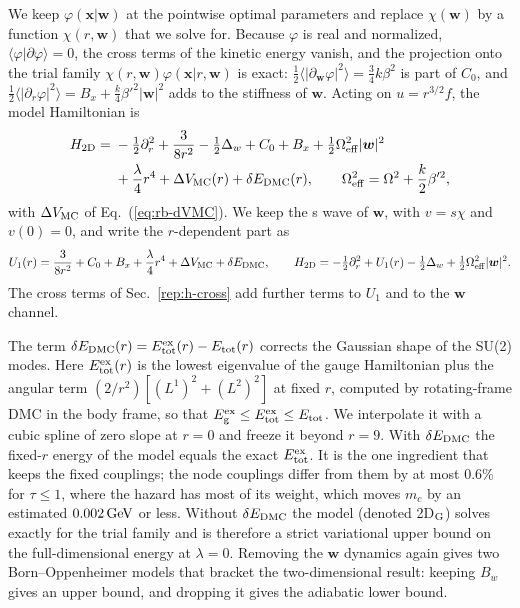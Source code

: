 We keep $\varphi(\bm x|\bm w)$ at the pointwise optimal parameters and replace $\chi(\bm w)$ by a function $\chi(r,\bm w)$ that we solve for.
Because $\varphi$ is real and normalized, $\langle\varphi|\partial\varphi\rangle=0$, the cross terms of the kinetic energy vanish, and the projection onto the trial family $\chi(r,\bm w)\varphi(\bm x|r,\bm w)$ is exact: $\frac12\langle|\partial_{\bm w}\varphi|^2\rangle=\frac34k\beta^2$ is part of $C_0$, and $\frac12\langle|\partial_r\varphi|^2\rangle=B_x+\frac k4\beta'^2|\bm w|^2$ adds to the stiffness of $\bm w$.
Acting on $u=r^{3/2}f$, the model Hamiltonian is
\begin{align}
H_{\rm 2D}={}&-\tfrac12\partial_r^2+\frac{3}{8r^2}-\tfrac12\Delta_w+C_0+B_x+\tfrac12\Omega_{\rm eff}^2|\bm w|^2\nonumber\\
&+\frac{\lambda}{4}r^4+\Delta V_{\rm MC}(r)+\delta E_{\rm DMC}(r),\qquad \Omega_{\rm eff}^2=\Omega^2+\frac k2\beta'^2 ,
\label{eq:rb-H2D}
\end{align}
with $\Delta V_{\rm MC}$ of Eq.~(\ref{eq:rb-dVMC}).
We keep the s wave of $\bm w$, with $v=s\chi$ and $v(0)=0$, and write the $r$-dependent part as
\begin{equation}
U_1(r)=\frac{3}{8r^2}+C_0+B_x+\frac\lambda4r^4+\Delta V_{\rm MC}+\delta E_{\rm DMC},\qquad
H_{\rm 2D}=-\tfrac12\partial_r^2+U_1(r)-\tfrac12\Delta_w+\tfrac12\Omega_{\rm eff}^2|\bm w|^2 . %
\label{eq:rb-U1}
\end{equation}
The cross terms of Sec.~\ref{rep:h-cross} add further terms to $U_1$ and to the $\bm w$ channel.

The term $\delta E_{\rm DMC}(r)=E_{\rm tot}^{\rm ex}(r)-E_{\rm tot}(r)$ corrects the Gaussian shape of the SU(2) modes.
Here $E_{\rm tot}^{\rm ex}(r)$ is the lowest eigenvalue of the gauge Hamiltonian plus the angular term $(2/r^2)[(L^1)^2+(L^2)^2]$ at fixed $r$, computed by rotating-frame DMC in the body frame, so that $E_{\rm g}^{\rm ex}\le E_{\rm tot}^{\rm ex}\le E_{\rm tot}$.
We interpolate it with a cubic spline of zero slope at $r=0$ and freeze it beyond $r=9$.
With $\delta E_{\rm DMC}$ the fixed-$r$ energy of the model equals the exact $E_{\rm tot}^{\rm ex}$.
It is the one ingredient that keeps the fixed couplings; the node couplings differ from them by at most $0.6\%$ for $\tau\le1$, where the hazard has most of its weight, which moves $m_c$ by an estimated $0.002\,\mathrm{GeV}$ or less. %
Without $\delta E_{\rm DMC}$ the model (denoted 2D$_{\rm G}$) solves exactly for the trial family and is therefore a strict variational upper bound on the full-dimensional energy at $\lambda=0$.
Removing the $\bm w$ dynamics again gives two Born--Oppenheimer models that bracket the two-dimensional result: keeping $B_w$ gives an upper bound, and dropping it gives the adiabatic lower bound.

